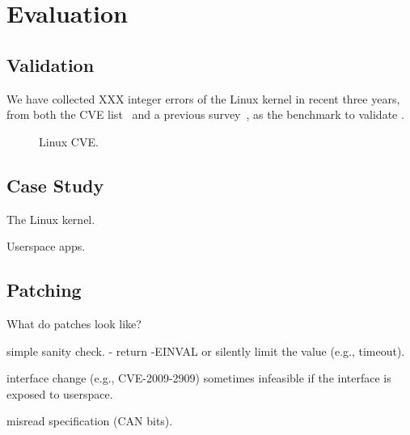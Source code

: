 \section{Evaluation}
\label{s:eval}

\subsection{Validation}

We have collected XXX integer errors of the Linux kernel in recent
three years, from both the CVE list~\cite{cve} and a previous
survey~\cite{chen:kbugs}, as the benchmark to validate \sys.

\newcommand{\ok}{\textcolor{JungleGreen}{\checkmark}\xspace}
\newcommand{\checked}{$\boxtimes$}
\begin{figure*}
\centering
\footnotesize

\caption{Linux CVE.}
\end{figure*}

\subsection{Case Study}

The Linux kernel.

Userspace apps.

\subsection{Patching}

What do patches look like?

simple sanity check.
- return -EINVAL or silently limit the value (e.g., timeout).

interface change (e.g., CVE-2009-2909)
sometimes infeasible if the interface is exposed to userspace.

misread specification (CAN bits).
